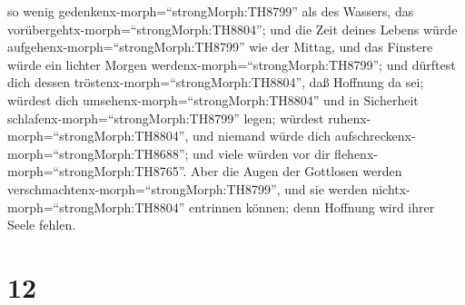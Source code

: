 so wenig gedenkenx-morph=``strongMorph:TH8799'' als des Wassers, das
vorübergehtx-morph=``strongMorph:TH8804'';  und die Zeit
deines Lebens würde aufgehenx-morph=``strongMorph:TH8799'' wie der
Mittag, und das Finstere würde ein lichter Morgen
werdenx-morph=``strongMorph:TH8799'';  und dürftest dich
dessen tröstenx-morph=``strongMorph:TH8804'', daß Hoffnung da sei;
würdest dich umsehenx-morph=``strongMorph:TH8804'' und in Sicherheit
schlafenx-morph=``strongMorph:TH8799'' legen;  würdest
ruhenx-morph=``strongMorph:TH8804'', und niemand würde dich
aufschreckenx-morph=``strongMorph:TH8688''; und viele würden vor dir
flehenx-morph=``strongMorph:TH8765''.  Aber die Augen der
Gottlosen werden verschmachtenx-morph=``strongMorph:TH8799'', und sie
werden nichtx-morph=``strongMorph:TH8804'' entrinnen können; denn
Hoffnung wird ihrer Seele fehlen.

\hypertarget{section-11}{%
\section{12}\label{section-11}}

